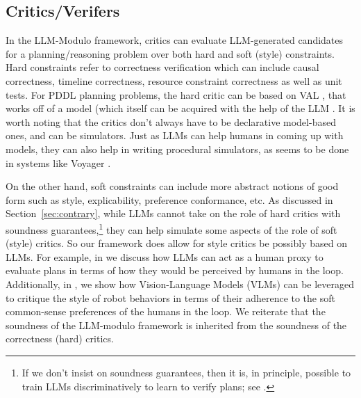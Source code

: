 \documentclass{article}
\newcommand{\bnote}[1]{\color{black}#1\color{black}}
\newcommand{\rao}[1]{\noindent\textcolor{red}{#1}}
\theoremstyle{plain}
\theoremstyle{definition}
\theoremstyle{remark}
\begin{document}




\subsection{Critics/Verifers}

In the LLM-Modulo framework, critics can evaluate LLM-generated
candidates for a planning/reasoning problem over both hard and soft (style)
constraints. Hard constraints refer to correctness verification which
can include causal correctness, timeline correctness, resource
constraint correctness as well as unit tests.
For PDDL planning problems, the hard critic can be based on VAL
\cite{howey2004val}, that works off of a model (which itself can be
acquired with the help of the LLM \cite{guan2023leveraging}.
%
\bnote{It is worth noting that the critics don't always have to be declarative
model-based ones, and can be simulators. Just as LLMs can help humans in
coming up with models, they can also help in writing procedural
simulators, as seems to be done in systems like Voyager \cite{voyager}.} 

On the other hand, soft constraints can include more abstract notions of
good form such as style, explicability, preference conformance, etc.
As discussed in Section~\ref{sec:contrary}, while LLMs cannot take on
the role of hard critics with soundness guarantees,\footnote{If we don't insist on soundness guarantees, then it is, in principle, possible to train LLMs discriminatively to learn to verify plans; see \cite{arora2023learning}.} they can help simulate some aspects of the
role of soft (style) critics. So our framework does allow for style
critics be possibly based on LLMs. \bnote{For example, in
  \cite{verma2024theory} we discuss how LLMs can act as a human proxy to
  evaluate plans in terms of how they would be perceived by humans in
  the loop. Additionally, in \cite{guan2024task}, we show how Vision-Language
  Models (VLMs) can be leveraged to critique the style of robot
  behaviors in terms of their adherence to the soft common-sense
  preferences of the humans in the loop. }
We reiterate that the soundness of the LLM-modulo framework is inherited
from the soundness of the correctness (hard) critics.
\end{document}

